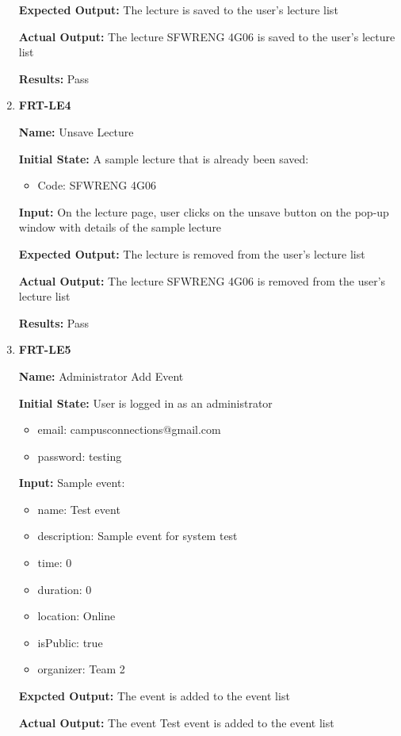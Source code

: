 \documentclass[12pt, titlepage]{article}
\begin{document}
\begin{enumerate}
\textbf{Expected Output:} The lecture is saved to the user's lecture list

\textbf{Actual Output:} The lecture SFWRENG 4G06 is saved to the user's lecture list

\textbf{Results:} Pass

\item \textbf{FRT-LE4}

\textbf{Name:} Unsave Lecture

\textbf{Initial State:} A sample lecture that is already been saved:
\begin{itemize}
\item Code: SFWRENG 4G06
\end{itemize}

\textbf{Input:} On the lecture page, user clicks on the unsave button on the pop-up window with details of the sample lecture
					
\textbf{Expected Output:} The lecture is removed from the user's lecture list

\textbf{Actual Output:} The lecture SFWRENG 4G06 is removed from the user's lecture list

\textbf{Results:} Pass

\item \textbf{FRT-LE5}

\textbf{Name:} Administrator Add Event

\textbf{Initial State:} User is logged in as an administrator
\begin{itemize}
\item email: campusconnections@gmail.com
\item password: testing
\end{itemize}

\textbf{Input:} Sample event:
\begin{itemize}
\item name: Test event
\item description: Sample event for system test
\item time: 0
\item duration: 0
\item location: Online
\item isPublic: true
\item organizer: Team 2
\end{itemize}
					
\textbf{Expcted Output:} The event is added to the event list

\textbf{Actual Output:} The event Test event is added to the event list


\end{enumerate}
\end{document}
